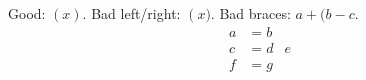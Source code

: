 \documentclass{article}
\begin{document}
Good: $\left( x \right)$.
Bad left/right: $\left( x )$.
Bad braces: $ a + (b - c $.
\begin{align}
a &= b \\
c &= d & e \\
f &= g
\end{align}
\end{document}
